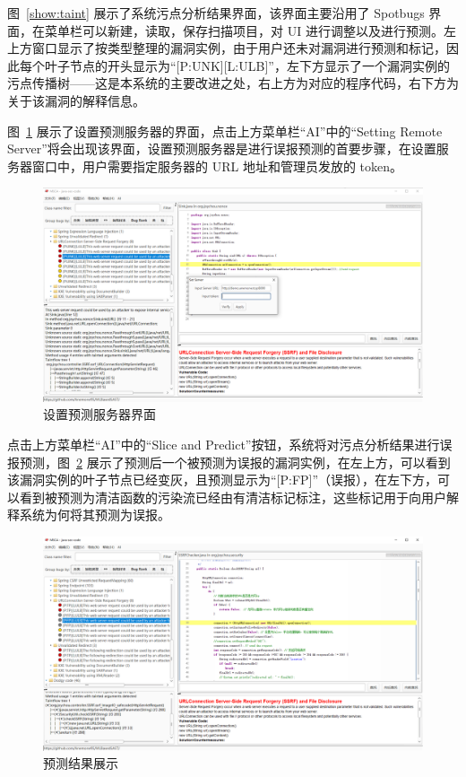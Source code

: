 图~\ref{show:taint} 展示了系统污点分析结果界面，该界面主要沿用了 Spotbugs 界面，在菜单栏可以新建，读取，保存扫描项目，对 UI 进行调整以及进行预测。左上方窗口显示了按类型整理的漏洞实例，由于用户还未对漏洞进行预测和标记，因此每个叶子节点的开头显示为“[P:UNK][L:ULB]”，左下方显示了一个漏洞实例的污点传播树——这是本系统的主要改进之处，右上方为对应的程序代码，右下方为关于该漏洞的解释信息。

图~\ref{show:settingServer} 展示了设置预测服务器的界面，点击上方菜单栏“AI”中的“Setting Remote Server”将会出现该界面，设置预测服务器是进行误报预测的首要步骤，在设置服务器窗口中，用户需要指定服务器的 URL 地址和管理员发放的 token。

 \begin{figure}[H]
     \centering
     \includegraphics[width=0.8\linewidth]{FIGs/chapter4/settingServer.png}
     \caption{设置预测服务器界面}\label{show:settingServer}
 \end{figure} 

点击上方菜单栏“AI”中的“Slice and Predict”按钮，系统将对污点分析结果进行误报预测，图~\ref{show:predictResult} 展示了预测后一个被预测为误报的漏洞实例，在左上方，可以看到该漏洞实例的叶子节点已经变灰，且预测显示为“[P:FP]”（误报），在左下方，可以看到被预测为清洁函数的污染流已经由有清洁标记标注，这些标记用于向用户解释系统为何将其预测为误报。

\begin{figure}[H]
    \centering
    \includegraphics[width=0.8\linewidth]{FIGs/chapter4/predictResult.png}
    \caption{预测结果展示}\label{show:predictResult}
\end{figure}

